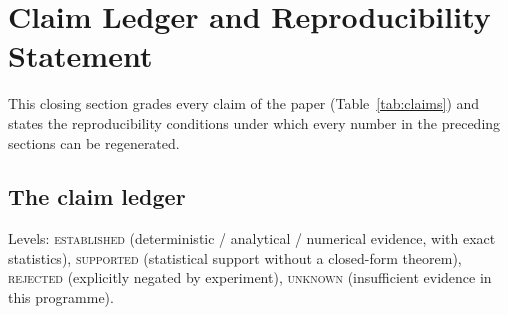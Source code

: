 \enlargethispage{3\baselineskip}
\section{Claim Ledger and Reproducibility Statement}
\label{sec:ledger}

This closing section grades every claim of the paper (Table~\ref{tab:claims})
and states the reproducibility conditions under which every number in the
preceding sections can be regenerated.

\subsection{The claim ledger}
\label{sec:claims}

Levels: \textsc{established} (deterministic / analytical / numerical
evidence, with exact statistics), \textsc{supported} (statistical support
without a closed-form theorem), \textsc{rejected} (explicitly negated by
experiment), \textsc{unknown} (insufficient evidence in this programme).
\clearpage

